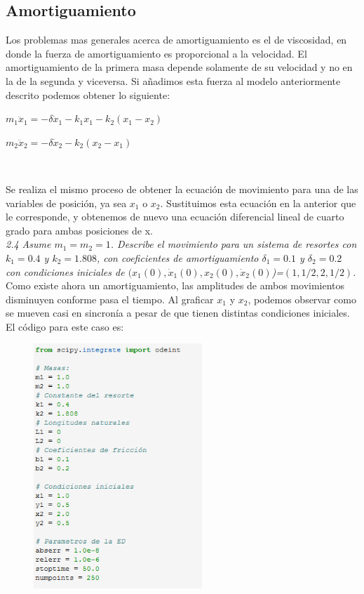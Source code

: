 \documentclass[12pt]{article}
\begin{document}
\subsection{Amortiguamiento}
Los problemas mas generales acerca de amortiguamiento es el de viscosidad, en donde la fuerza de amortiguamiento es proporcional a la velocidad. El amortiguamiento de la primera masa depende solamente de su velocidad y no en la de la segunda y viceversa. Si añadimos esta fuerza al modelo anteriormente descrito podemos obtener lo siguiente: \\

\centerline{$m_1 \ddot x_1 = -\delta \dot x_1 -k_1x_1 - k_2(x_1-x_2)$}
\centerline{$m_2 \ddot x_2 = -\delta \dot x_2 -k_2(x_2-x_1)$}
$    $

Se realiza el mismo proceso de obtener la ecuación de movimiento para una de las variables de posición, ya sea $x_1$ o $x_2$. Sustituimos esta ecuación en la anterior que le corresponde, y obtenemos de nuevo una ecuación diferencial lineal de cuarto grado para ambas posiciones de x. \\

\noindent \textit{2.4 Asume $m_1 = m_2 = 1$. Describe el movimiento para un sistema de resortes con $k_1=0.4$ y $k_2=1.808$, con coeficientes de amortiguamiento $\delta_1=0.1$ y $\delta_2=0.2$ con condiciones iniciales de $(x_1(0), \dot x_1(0), x_2(0), \dot x_2(0)$)=$(1,1/2,2,1/2)$.}\\

Como existe ahora un amortiguamiento, las amplitudes de ambos movimientos disminuyen conforme pasa el tiempo. Al graficar $x_1$ y $x_2$, podemos observar como se mueven casi en sincronía a pesar de que tienen distintas condiciones iniciales. El código para este caso es:  \\ 

\begin{figure}[h!]
    \centering
\includegraphics[width=2.5in]{Cod7.png}
\end{figure}
\end{document}
